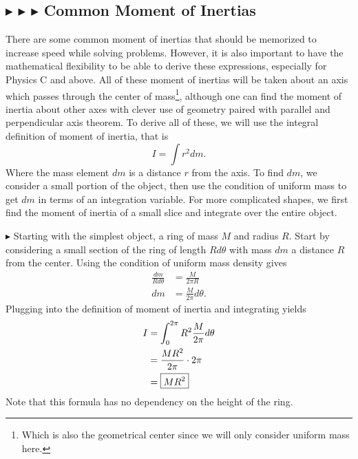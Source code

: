 \subsection{\color{PineGreen} $\blacktriangleright$ \color{Goldenrod} $\blacktriangleright$ \color{Orchid} $\blacktriangleright$ \color{black} Common Moment of Inertias} \label{1.4.3}
There are some common moment of inertias that should be memorized to increase speed while solving problems. However, it is also important to have the mathematical flexibility to be able to derive these expressions, especially for Physics C and above. All of these moment of inertias will be taken about an axis which passes through the center of mass\footnote{Which is also the geometrical center since we will only consider uniform mass here.}, although one can find the moment of inertia about other axes with clever use of geometry paired with parallel and perpendicular axis theorem. To derive all of these, we will use the integral definition of moment of inertia, that is
\begin{equation}
    I = \int r^2 dm.
\end{equation}
\noindent Where the mass element $dm$ is a distance $r$ from the axis. To find $dm$, we consider a small portion of the object, then use the condition of uniform mass to get $dm$ in terms of an integration variable. For more complicated shapes, we first find the moment of inertia of a small slice and integrate over the entire object.

\noindent $\blacktriangleright$ Starting with the simplest object, a ring of mass $M$ and radius $R$. Start by considering a small section of the ring of length $Rd\theta$ with mass $dm$ a distance $R$ from the center. Using the condition of uniform mass density gives
\begin{align*}
    \frac{dm}{Rd\theta} &= \frac{M}{2\pi R} \\
    dm &= \frac{M}{2\pi}d\theta.
\end{align*}
\noindent Plugging into the definition of moment of inertia and integrating yields
\begin{align}
    I &= \int_0^{2\pi} R^2 \frac{M}{2\pi}d\theta \nonumber \\
    &= \frac{MR^2}{2\pi}\cdot 2\pi \nonumber \\
    &= \boxed{MR^2}
\end{align}
\noindent Note that this formula has no dependency on the height of the ring.

